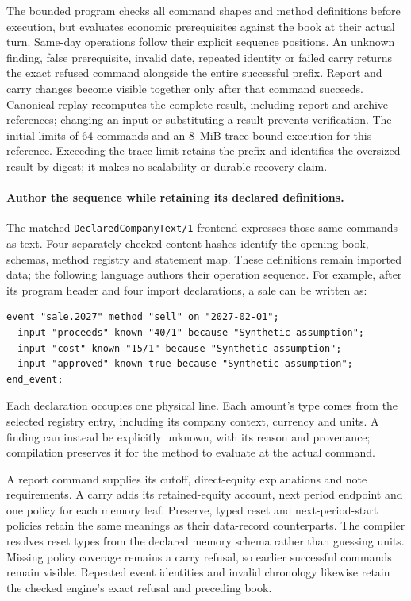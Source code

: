 The bounded program checks all command shapes and method definitions before
execution, but evaluates economic prerequisites against the book at their actual
turn. Same-day operations follow their explicit sequence positions. An unknown
finding, false prerequisite, invalid date, repeated identity or failed carry
returns the exact refused command alongside the entire successful prefix. Report
and carry changes become visible together only after that command succeeds.
Canonical replay recomputes the complete result, including report and archive
references; changing an input or substituting a result prevents verification.
The initial limits of 64 commands and an 8~MiB trace bound execution for this
reference. Exceeding the trace limit retains the prefix and identifies the
oversized result by digest; it makes no scalability or durable-recovery claim.


\paragraph{Author the sequence while retaining its declared definitions.}
The matched \texttt{DeclaredCompanyText/1} frontend expresses those same commands
as text. Four separately checked content hashes identify the opening book,
schemas, method registry and statement map. These definitions remain imported
data; the following language authors their operation sequence. For example,
after its program header and four import declarations, a sale can be written as:
\begin{lstlisting}
event "sale.2027" method "sell" on "2027-02-01";
  input "proceeds" known "40/1" because "Synthetic assumption";
  input "cost" known "15/1" because "Synthetic assumption";
  input "approved" known true because "Synthetic assumption";
end_event;
\end{lstlisting}
Each declaration occupies one physical line. Each amount's type comes from
the selected registry entry, including its company context, currency and units.
A finding can instead be explicitly unknown, with its reason and provenance;
compilation preserves it for the method to evaluate at the actual command.

A report command supplies its cutoff, direct-equity explanations and note
requirements. A carry adds its retained-equity account, next period endpoint and
one policy for each memory leaf. Preserve, typed reset and next-period-start
policies retain the same meanings as their data-record counterparts. The compiler
resolves reset types from the declared memory schema rather than guessing units.
Missing policy coverage remains a carry refusal, so earlier successful commands
remain visible. Repeated event identities and invalid chronology likewise retain
the checked engine's exact refusal and preceding book.

